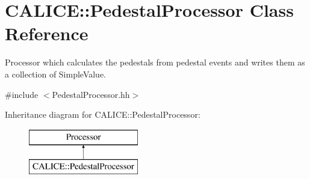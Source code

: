 \section{C\-A\-L\-I\-C\-E\-:\-:Pedestal\-Processor Class Reference}
\label{classCALICE_1_1PedestalProcessor}


Processor which calculates the pedestals from pedestal events and writes them as a collection of Simple\-Value.  




{\ttfamily \#include $<$Pedestal\-Processor.\-hh$>$}

Inheritance diagram for C\-A\-L\-I\-C\-E\-:\-:Pedestal\-Processor\-:\begin{figure}[H]
\begin{center}
\leavevmode
\includegraphics[height=2.000000cm]{classCALICE_1_1PedestalProcessor}
\end{center}
\end{figure}
